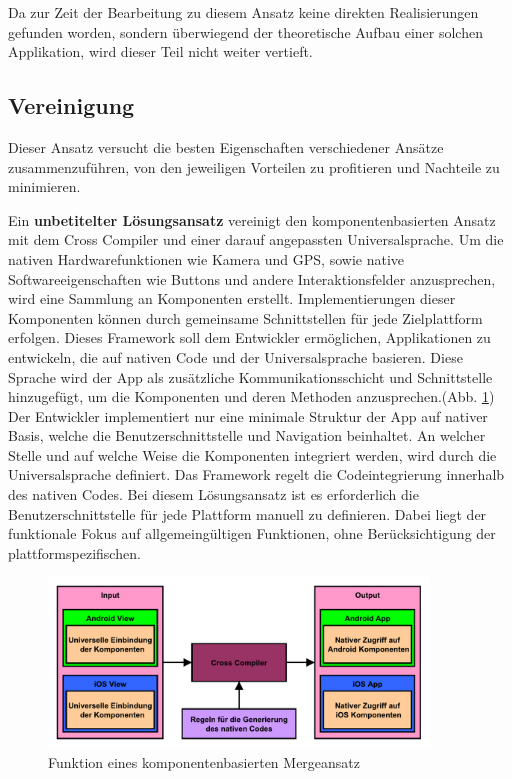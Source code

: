 Da zur Zeit der Bearbeitung zu diesem Ansatz keine direkten Realisierungen gefunden worden, sondern überwiegend der theoretische Aufbau einer solchen Applikation, wird dieser Teil nicht weiter vertieft.

\subsection{Vereinigung}
Dieser Ansatz versucht die besten Eigenschaften verschiedener Ansätze zusammenzuführen, von den jeweiligen Vorteilen zu profitieren und Nachteile zu minimieren.

\bigskip
Ein \textbf{unbetitelter Lösungsansatz} vereinigt den komponentenbasierten Ansatz mit dem Cross Compiler und einer darauf angepassten Universalsprache. Um die nativen Hardwarefunktionen wie Kamera und GPS, sowie native Softwareeigenschaften wie Buttons und andere Interaktionsfelder anzusprechen, wird eine Sammlung an Komponenten erstellt. Implementierungen dieser Komponenten können durch gemeinsame Schnittstellen für jede Zielplattform erfolgen. Dieses Framework soll dem Entwickler ermöglichen, Applikationen zu entwickeln, die auf nativen Code und der Universalsprache basieren. Diese Sprache wird der App als zusätzliche Kommunikationsschicht und Schnittstelle hinzugefügt, um die Komponenten und deren Methoden anzusprechen.(Abb. \ref{graph_merge_component_based}) Der Entwickler implementiert nur eine minimale Struktur der App auf nativer Basis, welche die Benutzerschnittstelle und Navigation beinhaltet. An welcher Stelle und auf welche Weise die Komponenten integriert werden, wird durch die Universalsprache definiert. Das Framework regelt die Codeintegrierung innerhalb des nativen Codes. Bei diesem Lösungsansatz ist es erforderlich die Benutzerschnittstelle für jede Plattform manuell zu definieren. Dabei liegt der funktionale Fokus auf allgemeingültigen Funktionen, ohne Berücksichtigung der plattformspezifischen.

\begin{figure}[htbp]
	\centering
	\includegraphics[width=0.9\textwidth]{Bilder/Merge_Component_based}
	\caption{Funktion eines komponentenbasierten Mergeansatz}\label{graph_merge_component_based}
\end{figure}


